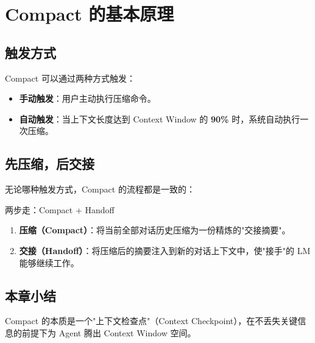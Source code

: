 \section{Compact 的基本原理}

\subsection{触发方式}

Compact 可以通过两种方式触发：

\begin{itemize}
    \item \textbf{手动触发}：用户主动执行压缩命令。
    \item \textbf{自动触发}：当上下文长度达到 Context Window 的 \textbf{90\%} 时，系统自动执行一次压缩。
\end{itemize}

\subsection{先压缩，后交接}

无论哪种触发方式，Compact 的流程都是一致的：

\begin{importantbox}{两步走：Compact + Handoff}
\begin{enumerate}
    \item \textbf{压缩（Compact）}：将当前全部对话历史压缩为一份精炼的"交接摘要"。
    \item \textbf{交接（Handoff）}：将压缩后的摘要注入到新的对话上下文中，使"接手"的 LM 能够继续工作。
\end{enumerate}
\end{importantbox}

\subsection{本章小结}

Compact 的本质是一个"上下文检查点"（Context Checkpoint），在不丢失关键信息的前提下为 Agent 腾出 Context Window 空间。


